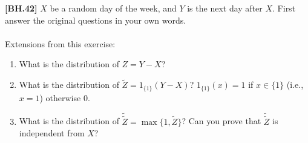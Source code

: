\begin{exercise}
	\textbf{[BH.42]} $X$ be a random day of the week, and $Y$ is the next day after $X$. First answer the original questions in your own words.\\~\\
	Extensions from this exercise:
\begin{enumerate}
	\item What is the distribution of $Z=Y-X$? 
	\item What is the distribution of $\tilde{Z}=1_{\{1\}}(Y-X)$? $1_{\{1\}}(x)=1$ if $x\in\{1\}$ (i.e.,$x=1$) otherwise 0.
	\item What is the distribution of $\tilde{\tilde{Z}}=\max\{1,\tilde{Z}\}$? Can you prove that $\tilde{\tilde{Z}}$ is independent from $X$?
\end{enumerate}
\end{exercise}